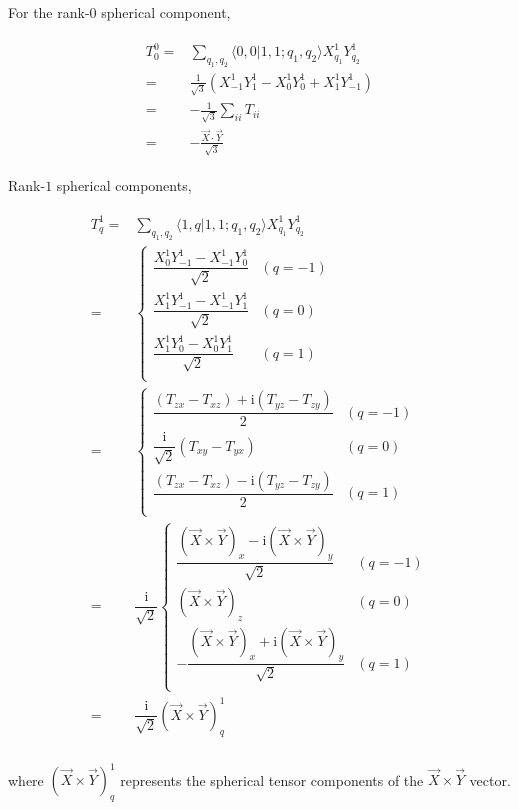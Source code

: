 \documentclass[10pt,fleqn]{article}
\newcommand{\ui}{\mathrm{i}}
\newcommand{\eqar}[1]
{
  \begin{align}
    #1
  \end{align}
}
\newcommand{\paren}[1]{{\left({#1}\right)}}
\begin{document}
For the rank-$0$ spherical component,
\eqar{
  \begin{split}
    T^0_0=&\sum_{q_1,q_2}\langle 0,0|1,1;q_1,q_2\rangle X^1_{q_1}Y^1_{q_2}\\
    =&\frac{1}{\sqrt3}\paren{X^1_{-1}Y^1_{1}-X^1_{0}Y^1_{0}+X^1_{1}Y^1_{-1}}\\
    =&-\frac{1}{\sqrt3}\sum_{ii}T_{ii}\\
    =&-\frac{\vec X\cdot\vec Y}{\sqrt3}
  \end{split}
}
Rank-$1$ spherical components,
\eqar{
  \begin{split}
    T^1_q=&\sum_{q_1,q_2}\langle 1,q|1,1;q_1,q_2\rangle X^1_{q_1}Y^1_{q_2}\\
    =&\begin{cases}
      \dfrac{X^1_{0}Y^1_{-1}-X^1_{-1}Y^1_{0}}{\sqrt2}&(q=-1)\\
      \dfrac{X^1_{1}Y^1_{-1}-X^1_{-1}Y^1_{1}}{\sqrt2}&(q=0)\\
      \dfrac{X^1_{1}Y^1_{0}-X^1_{0}Y^1_{1}}{\sqrt2}&(q=1)\\
    \end{cases}\\
    =&\begin{cases}
      \dfrac{\paren{T_{zx}-T_{xz}}+\ui\paren{T_{yz}-T_{zy}}}{2}&(q=-1)\\
      \dfrac{\ui}{\sqrt2}\paren{T_{xy}-T_{yx}}&(q=0)\\
      \dfrac{\paren{T_{zx}-T_{xz}}-\ui\paren{T_{yz}-T_{zy}}}{2}&(q=1)\\
    \end{cases}\\
    =&\dfrac{\ui}{\sqrt2}\begin{cases}
      \dfrac{\paren{\vec X\times\vec Y}_x-\ui\paren{\vec X\times\vec Y}_y}{\sqrt2}&(q=-1)\\
      \paren{\vec X\times\vec Y}_z&(q=0)\\
      -\dfrac{\paren{\vec X\times\vec Y}_x+\ui\paren{\vec X\times\vec Y}_y}{\sqrt2}&(q=1)\\
    \end{cases}\\
    =&\dfrac{\ui}{\sqrt2}\paren{\vec X\times\vec Y}^1_q\\
  \end{split}
}
where $\paren{\vec X\times\vec Y}^1_q$ represents the spherical tensor components
of the $\vec X\times\vec Y$ vector.\\
\end{document}

